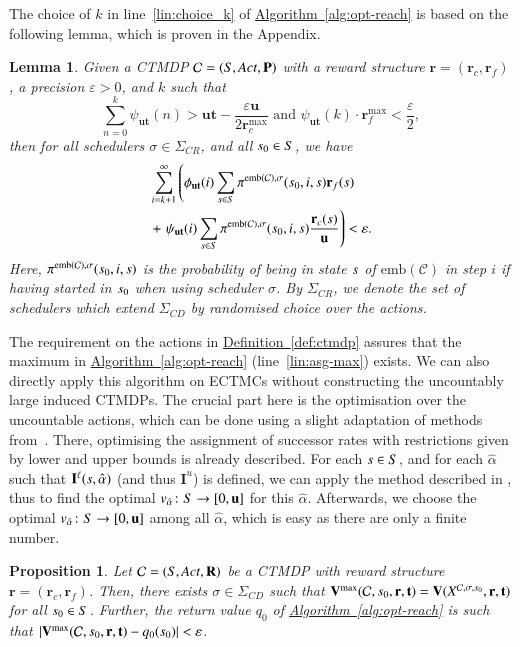 \documentclass[10pt,twocolumn]{article}
\newtheorem{lemma}{Lemma}
\newcommand{\states} {{\ensuremath S}}
\newcommand{\state}  {{\ensuremath s}}
\newcommand{\sched}  {{\ensuremath {\sigma}}}
\newcommand{\acts}{\mathit{Act}}
\newcommand{\pmat}{\mathbf{P}}
\newcommand{\rmat}{\mathbf{R}}
\newcommand{\cmodel}{\mathcal{C}}
\newcommand{\urate}{\mathbf{u}}
\newcommand{\act}{\alpha}
\newcommand{\schedscr}{\Sigma_\mathit{CR}}
\newcommand{\schedscd}{\Sigma_\mathit{CD}}
\newtheorem{proposition}{Proposition}
\newcommand{\rew}{\mathbf{r}}
\newcommand{\frew}{\mathbf{r}_f}
\newcommand{\crew}{\mathbf{r}_c}
\newcommand{\timeb}{\mathbf{t}}
\newcommand{\mvalue}{\mathbf{V}}
\newcommand{\precision}{\varepsilon}
\newcommand{\emb}{\mathrm{emb}}
\newcommand{\stopro}{X}
\newcommand{\ivall}{{\mathbf{I}^{\ell}}}
\newcommand{\ivalu}{{\mathbf{I}^u}}
\newcommand{\refdef}[1]{\texorpdfstring{\hyperref[def:#1]{Definition~\ref*{def:#1}}}{Definition \ref*{def:#1}}}
\newcommand{\refalg}[1]{\texorpdfstring{\hyperref[alg:#1]{Algorithm~\ref*{alg:#1}}}{Algorithm~\ref*{alg:#1}}}
\newcommand{\tprob}{\pi}
\begin{document}
The choice of $k$ in line~\ref{lin:choice_k} of \refalg{opt-reach} 
is based on the following lemma, which is proven in the Appendix.
\begin{lemma}
  \label{lem:precbound}
  Given a CTMDP $\cmodel = (\states, \acts, \pmat)$ with a reward structure $\rew = (\crew, \frew)$, a precision $\precision > 0$, and $k$ such that
  \[
  \sum_{n=0}^k\psi_{\urate \timeb}(n) > \urate \timeb - \frac{\precision \urate}{2\crew^{\max}} \mbox{ and } \psi_{\urate \timeb}(k) \cdot \frew^{\max} < \frac{\precision}{2},
  \]
  then for all schedulers $\sched \in \schedscr$, and all $\state_0 \in \states$, we have
\begin{equation*}
\begin{split}
  & \sum_{i=k+1}^\infty \left(\phi_{\urate \timeb}(i) \sum_{\state \in \states} \tprob^{\emb(\cmodel),\sched}(\state_0, i, \state) \frew(\state)\right. \\
  & + \left.\psi_{\urate \timeb}(i) \sum_{\state \in \states} \tprob^{\emb(\cmodel),\sched}(\state_0, i, \state)
    \frac{\crew(\state)}{\urate}\right) < \precision .
\end{split}
\end{equation*}
Here, $\tprob^{\emb(\cmodel),\sched}(\state_0, i, \state)$ is the probability of being in state $\state$ of $\emb(\cmodel)$ in step $i$ if having started in $\state_0$ when using scheduler $\sched$.
By $\schedscr$, we denote the set of schedulers which extend $\schedscd$ by randomised choice over the actions.
\end{lemma}
The requirement on the actions in \refdef{ctmdp} assures that the
maximum in \refalg{opt-reach} (line~\ref{lin:asg-max}) exists. We can also directly apply this
algorithm on ECTMCs without constructing the uncountably large induced
CTMDPs. The crucial part here is the optimisation over the
uncountable actions, which can be done using a slight adaptation of
methods from~\cite[Chapter 4.1]{Klink10}. There, optimising the
assignment of successor rates with restrictions given by lower and
upper bounds is already described. 
For each $\state \in \states$, and for each $\hat{\act}$ such that $\ivall(\state,\hat{\act})$ (and thus $\ivalu$) is defined, we can apply the method described in \cite[Chapter 4.1]{Klink10}, thus to find the optimal $v_{\hat{\act}}\colon \states \to [0,\urate]$ for this $\hat{\act}$.
Afterwards, we choose the optimal $v_{\hat{\act}}\colon \states \to [0,\urate]$ among all $\hat{\act}$, which is easy as there are only a finite number.
\begin{proposition}
  \label{pro:algo-correctness}
Let $\cmodel = (\states, \acts, \rmat)$ be a CTMDP with reward structure $\rew = (\crew, \frew)$.
  Then, there exists $\sched \in \schedscd$ such that $\mvalue^{\max}(\cmodel, \state_0, \rew, \timeb) = \mvalue(\stopro^{\cmodel,\sched,\state_0},\rew, \timeb)$ for all $\state_0 \in \states$.
  Further, the return value $q_0$ of \refalg{opt-reach} is such 
  that $|\mvalue^{\max}(\cmodel, \state_0, \rew, \timeb) - q_0(\state_0)| < \precision$.
\end{proposition}
\end{document}
